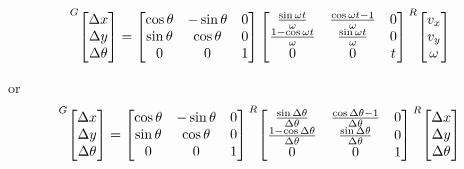 \begin{theorem}
  \begin{equation}
    \prescript{G}{}{\begin{bmatrix}
      \Delta x \\
      \Delta y \\
      \Delta \theta
    \end{bmatrix}} =
    \begin{bmatrix}
      \cos\theta & -\sin\theta & 0 \\
      \sin\theta &  \cos\theta & 0 \\
               0 &           0 & 1
    \end{bmatrix}
    \begin{bmatrix}
      \frac{\sin\omega t}{\omega} & \frac{\cos\omega t - 1}{\omega} & 0 \\
      \frac{1 - \cos\omega t}{\omega} & \frac{\sin\omega t}{\omega} & 0 \\
      0 & 0 & t
    \end{bmatrix}
    \prescript{R}{}{\begin{bmatrix}
      v_x \\
      v_y \\
      \omega
    \end{bmatrix}}
    \label{eq:pose_exponential}
  \end{equation}

  or
  \begin{equation}
    \prescript{G}{}{\begin{bmatrix}
      \Delta x \\
      \Delta y \\
      \Delta \theta
    \end{bmatrix}} =
    \begin{bmatrix}
      \cos\theta & -\sin\theta & 0 \\
      \sin\theta &  \cos\theta & 0 \\
               0 &           0 & 1
    \end{bmatrix}
    \prescript{R}{}{\begin{bmatrix}
      \frac{\sin\Delta\theta}{\Delta\theta} &
        \frac{\cos\Delta\theta - 1}{\Delta\theta} & 0 \\
      \frac{1 - \cos\Delta\theta}{\Delta\theta} &
        \frac{\sin\Delta\theta}{\Delta\theta} & 0 \\
      0 & 0 & 1
    \end{bmatrix}}
    \prescript{R}{}{\begin{bmatrix}
      \Delta x \\
      \Delta y \\
      \Delta\theta
    \end{bmatrix}}
  \end{equation}


\end{theorem}
